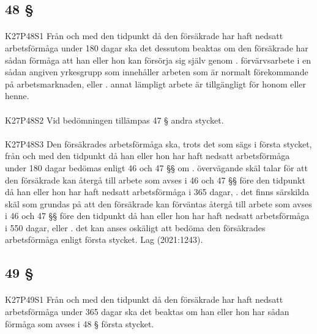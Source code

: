 \documentclass[a4paper,notitlepage,openany,10pt]{book}
\begin{document}
\subsection*{48 §}
\paragraph*{}
{\tiny K27P48S1}
Från och med den tidpunkt då den försäkrade har haft nedsatt arbetsförmåga under 180 dagar ska det dessutom beaktas om den försäkrade har sådan förmåga att han eller hon kan försörja sig själv genom
. förvärvsarbete i en sådan angiven yrkesgrupp som innehåller arbeten som är normalt förekommande på arbetsmarknaden, eller
. annat lämpligt arbete är tillgängligt för honom eller henne.
\paragraph*{}
{\tiny K27P48S2}
Vid bedömningen tillämpas 47 § andra stycket.
\paragraph*{}
{\tiny K27P48S3}
Den försäkrades arbetsförmåga ska, trots det som sägs i första stycket, från och med den tidpunkt då han eller hon har haft nedsatt arbetsförmåga under 180 dagar bedömas enligt 46 och 47 §§ om
. övervägande skäl talar för att den försäkrade kan återgå till arbete som avses i 46 och 47 §§ före den tidpunkt då han eller hon har haft nedsatt arbetsförmåga i 365 dagar,
. det finns särskilda skäl som grundas på att den försäkrade kan förväntas återgå till arbete som avses i 46 och 47 §§ före den tidpunkt då han eller hon har haft nedsatt arbetsförmåga i 550 dagar, eller
. det kan anses oskäligt att bedöma den försäkrades arbetsförmåga enligt första stycket.
Lag (2021:1243).
\subsection*{49 §}
\paragraph*{}
{\tiny K27P49S1}
Från och med den tidpunkt då den försäkrade har haft nedsatt arbetsförmåga under 365 dagar ska det beaktas om han eller hon har sådan förmåga som avses i 48 § första stycket.
\end{document}
